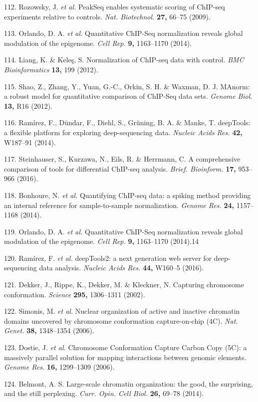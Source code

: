 \documentclass[11pt,twoside]{MPIthesis}
\theoremstyle{definition}
\theoremstyle{definition}
\theoremstyle{definition}
\theoremstyle{remark}
\begin{document}
112. Rozowsky, J. \emph{et al.} PeakSeq enables systematic scoring of
ChIP-seq experiments relative to controls. \emph{Nat. Biotechnol.}
\textbf{27,} 66--75 (2009).

113. Orlando, D. A. \emph{et al.} Quantitative ChIP-Seq normalization
reveals global modulation of the epigenome. \emph{Cell Rep.} \textbf{9,}
1163--1170 (2014).

114. Liang, K. \& Keleş, S. Normalization of ChIP-seq data with control.
\emph{BMC Bioinformatics} \textbf{13,} 199 (2012).

115. Shao, Z., Zhang, Y., Yuan, G.-C., Orkin, S. H. \& Waxman, D. J.
MAnorm: a robust model for quantitative comparison of ChIP-Seq data
sets. \emph{Genome Biol.} \textbf{13,} R16 (2012).

116. Ramírez, F., Dündar, F., Diehl, S., Grüning, B. A. \& Manke, T.
deepTools: a flexible platform for exploring deep-sequencing data.
\emph{Nucleic Acids Res.} \textbf{42,} W187--91 (2014).

117. Steinhauser, S., Kurzawa, N., Eils, R. \& Herrmann, C. A
comprehensive comparison of tools for differential ChIP-seq analysis.
\emph{Brief. Bioinform.} \textbf{17,} 953--966 (2016).

118. Bonhoure, N. \emph{et al.} Quantifying ChIP-seq data: a spiking
method providing an internal reference for sample-to-sample
normalization. \emph{Genome Res.} \textbf{24,} 1157--1168 (2014).

119. Orlando, D. A. \emph{et al.} Quantitative ChIP-Seq normalization
reveals global modulation of the epigenome. \emph{Cell Rep.} \textbf{9,}
1163--1170 (2014).14

120. Ramírez, F. \emph{et al.} deepTools2: a next generation web server
for deep-sequencing data analysis. \emph{Nucleic Acids Res.}
\textbf{44,} W160--5 (2016).

121. Dekker, J., Rippe, K., Dekker, M. \& Kleckner, N. Capturing
chromosome conformation. \emph{Science} \textbf{295,} 1306--1311 (2002).

122. Simonis, M. \emph{et al.} Nuclear organization of active and
inactive chromatin domains uncovered by chromosome conformation
capture-on-chip (4C). \emph{Nat. Genet.} \textbf{38,} 1348--1354 (2006).

123. Dostie, J. \emph{et al.} Chromosome Conformation Capture Carbon
Copy (5C): a massively parallel solution for mapping interactions
between genomic elements. \emph{Genome Res.} \textbf{16,} 1299--1309
(2006).

124. Belmont, A. S. Large-scale chromatin organization: the good, the
surprising, and the still perplexing. \emph{Curr. Opin. Cell Biol.}
\textbf{26,} 69--78 (2014).
\end{document}
